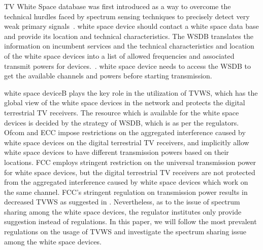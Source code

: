 \documentclass[times]{ettauth}
\theoremstyle{mytheoremstyle}
\theoremstyle{mytheoremstyle}
\theoremstyle{mytheoremstyle}
\begin{document}
TV White Space database was first introduced as a way to overcome the technical hurdles faced by spectrum sensing techniques to precisely detect very weak primary signals~\cite{Mwangoka2011DySPAN}.
white space device should contact a white space data base and provide its location and technical characteristics.
The WSDB translates the information on incumbent services and the technical characteristics and location of the white space devices into a list of allowed frequencies and associated transmit powers for devices.~\cite{ECC236}.
white space device needs to access the WSDB to get the available channels and powers before starting transmission.

white space deviceB plays the key role in the utilization of TVWS, which has the global view of the white space devices in the network and protects the digital terrestrial TV receivers.
The resource which is available for the white space devices is decided by the strategy of WSDB, which is as per the regulators.
Ofcom and ECC impose restrictions on the aggregated interference caused by white space devices on the digital terrestrial TV receivers, and implicitly allow white space devices to have different transmission powers based on their locations.
FCC employs stringent restriction on the universal transmission power for white space devices, but the digital terrestrial TV receivers are not protected from the aggregated interference caused by white space devices which work on the same channel. 
FCC's stringent regulation on transmission power results in decreased TVWS as suggested in \cite{Harrison2012Dyspan}.
%
Nevertheless, as to the issue of spectrum sharing among the white space devices, the regulator institutes only provide suggestion instead of regulations.
In this paper, we will follow the most prevalent regulations on the usage of TVWS and investigate the spectrum sharing issue among the white space devices.





\end{document}
